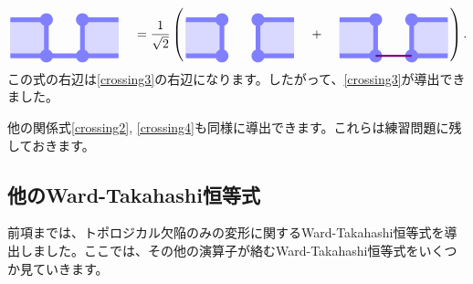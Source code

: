 \documentclass[report,paper=a4, fontsize=12pt, line_length=16cm, number_of_lines=33,dvipdfmx]{jlreq}
\numberwithin{equation}{chapter}
\begin{document}
\begin{align}
  \begin{tikzpicture}[baseline=0.5cm]
      \foreach \x in {0,2}{
          \foreach \y in {-2,-1,...,1}{
          \fill[plaqblue](\x,0) rectangle (\x+1,1);
          }
      }
      \foreach \x in {1,2}{
          \foreach \y in {0,1}{
              \fill[linkblue] (\x,\y) circle (1.8mm);
          }
      }
      \foreach \x/\y in {0/0,1/0,2/0,0/1,2/1}{
              \draw[linkblue, line width = 1.3mm](\x,\y)--(\x + 1,\y);
      }
      \foreach \x in {1,2}{
          \draw[linkblue, line width = 1.3mm](\x,0)--(\x, 1);
      }
  \end{tikzpicture}
  \quad = \frac{1}{\sqrt{2}}\left(
      \begin{tikzpicture}[baseline=0.5cm]
          \foreach \x in {0,2}{
              \foreach \y in {-2,-1,...,1}{
              \fill[plaqblue](\x,0) rectangle (\x+1,1);
              }
          }
          \foreach \x in {1,2}{
              \foreach \y in {0,1}{
                  \fill[linkblue] (\x,\y) circle (1.8mm);
              }
          }
          \foreach \x/\y in {0/0,2/0,0/1,2/1}{
                  \draw[linkblue, line width = 1.3mm](\x,\y)--(\x + 1,\y);
          }
          \foreach \x in {1,2}{
              \draw[linkblue, line width = 1.3mm](\x,0)--(\x, 1);
          }
      \end{tikzpicture}
      \quad + \quad
      \begin{tikzpicture}[baseline=0.5cm]
          \foreach \x in {0,2}{
              \foreach \y in {-2,-1,...,1}{
              \fill[plaqblue](\x,0) rectangle (\x+1,1);
              }
          }
          \foreach \x in {1,2}{
              \foreach \y in {0,1}{
                  \fill[linkblue] (\x,\y) circle (1.8mm);
              }
          }
          \foreach \x/\y in {0/0,2/0,0/1,2/1}{
                  \draw[linkblue, line width = 1.3mm](\x,\y)--(\x + 1,\y);
          }
          \foreach \x in {1,2}{
              \draw[linkblue, line width = 1.3mm](\x,0)--(\x, 1);
          }
          \draw[red!50!blue, ultra thick](1,0)--(2,0);
      \end{tikzpicture}        
  \right).
\end{align}
この式の右辺は\eqref{crossing3}の右辺になります。したがって、\eqref{crossing3}が導出できました。

他の関係式\eqref{crossing2}, \eqref{crossing4}も同様に導出できます。これらは練習問題に残しておきます。

\subsection{他のWard-Takahashi恒等式}
前項までは、トポロジカル欠陥のみの変形に関するWard-Takahashi恒等式を導出しました。ここでは、その他の演算子が絡むWard-Takahashi恒等式をいくつか見ていきます。
\end{document}
